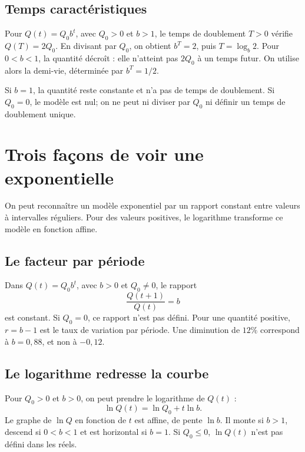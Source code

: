 \begin{center}
\end{center}

\subsection{Temps caractéristiques}
Pour $Q(t)=Q_0b^t$, avec $Q_0>0$ et $b>1$, le temps de doublement $T>0$ vérifie $Q(T)=2Q_0$. En divisant par $Q_0$, on obtient $b^T=2$, puis $T=\log_b2$. Pour $0<b<1$, la quantité décroît : elle n'atteint pas $2Q_0$ à un temps futur. On utilise alors la demi-vie, déterminée par $b^T=1/2$.

Si $b=1$, la quantité reste constante et n'a pas de temps de doublement. Si $Q_0=0$, le modèle est nul; on ne peut ni diviser par $Q_0$ ni définir un temps de doublement unique.


\section{Trois façons de voir une exponentielle}
\label{manual:section:06.07}

On peut reconnaître un modèle exponentiel par un rapport constant entre valeurs à intervalles réguliers. Pour des valeurs positives, le logarithme transforme ce modèle en fonction affine.

\subsection{Le facteur par période}
Dans $Q(t)=Q_0b^t$, avec $b>0$ et $Q_0\ne0$, le rapport
\[
\frac{Q(t+1)}{Q(t)}=b
\]
est constant. Si $Q_0=0$, ce rapport n'est pas défini. Pour une quantité positive, $r=b-1$ est le taux de variation par période. Une diminution de $12\%$ correspond à $b=0{,}88$, et non à $-0{,}12$.

\subsection{Le logarithme redresse la courbe}
Pour $Q_0>0$ et $b>0$, on peut prendre le logarithme de $Q(t)$ :
\[
\ln Q(t)=\ln Q_0+t\ln b.
\]
Le graphe de $\ln Q$ en fonction de $t$ est affine, de pente $\ln b$. Il monte si $b>1$, descend si $0<b<1$ et est horizontal si $b=1$. Si $Q_0\le0$, $\ln Q(t)$ n'est pas défini dans les réels.

